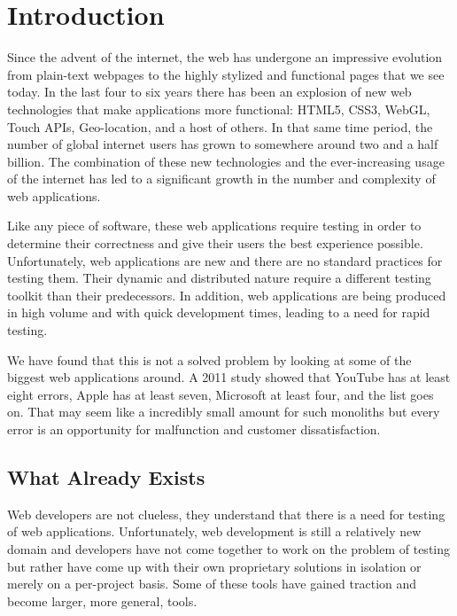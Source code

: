 \documentclass[12pt]{ucthesis}
\begin{document}
\pagestyle{plain}

\renewcommand{\baselinestretch}{1.66}

\chapter{Introduction}
Since the advent of the internet, the web has undergone an impressive evolution from plain-text webpages to the highly stylized and functional pages that we see today. In the last four to six years there has been an explosion of new web technologies that make applications more functional: HTML5, CSS3, WebGL, Touch APIs, Geo-location, and a host of others. \cite{EvolutionOfWeb} In that same time period, the number of global internet users has grown to somewhere around two and a half billion. \cite{EvolutionOfWeb} The combination of these new technologies and the ever-increasing usage of the internet has led to a significant growth in the number and complexity of web applications.

Like any piece of software, these web applications require testing in order to determine their correctness and give their users the best experience possible. Unfortunately, web applications are new and there are no standard practices for testing them. Their dynamic and distributed nature require a different testing toolkit than their predecessors. In addition, web applications are being produced in high volume and with quick development times, leading to a need for rapid testing.

We have found that this is not a solved problem by looking at some of the biggest web applications around. A 2011 study showed that YouTube has at least eight errors, Apple has at least seven, Microsoft at least four, and the list goes on. \cite{ErrorsInTheWild} That may seem like a incredibly small amount for such monoliths but every error is an opportunity for malfunction and customer dissatisfaction.

\section{What Already Exists}
Web developers are not clueless, they understand that there is a need for testing of web applications. Unfortunately, web development is still a relatively new domain and developers have not come together to work on the problem of testing but rather have come up with their own proprietary solutions in isolation or merely on a per-project basis. Some of these tools have gained traction and become larger, more general, tools.
\end{document}
